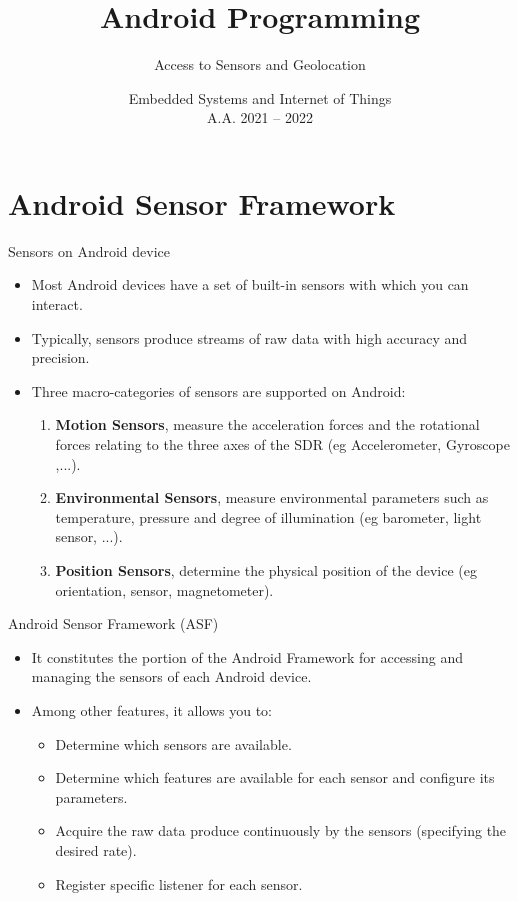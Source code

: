 \documentclass{beamer}
\title[Android -- 3B -- Sensor, Geolocation]{Android Programming}
\subtitle{Access to Sensors and Geolocation}
\date[ver. 1.0 (20220505)]{Embedded Systems and Internet of Things\\A.A. 2021 -- 2022}
\begin{document}
\begin{frame}
  \titlepage
\end{frame}




\section{Android Sensor Framework}

  \begin{frame}{Sensors on Android device}
    \begin{itemize}\itemsep10pt
      \item Most Android devices have a set of built-in sensors with which you
      can interact.
      \item Typically, sensors produce streams of raw data with high accuracy
      and precision.
      \item Three macro-categories of sensors are supported on Android:
      \begin{enumerate}
        \item \textbf{Motion Sensors}, measure the acceleration forces and the rotational
        forces relating to the three axes of the SDR (eg Accelerometer,
        Gyroscope ,...).
        \item \textbf{Environmental Sensors}, measure environmental parameters
        such as temperature, pressure and degree of illumination (eg barometer,
        light sensor, ...).
        \item \textbf{Position Sensors}, determine the physical position of the
        device (eg orientation, sensor, magnetometer).
      \end{enumerate}
    \end{itemize}
  \end{frame}

  \begin{frame}{Android Sensor Framework (ASF)}
    \begin{itemize}\itemsep20pt
      \item It constitutes the portion of the Android Framework for accessing
      and managing the sensors of each Android device.
      \item Among other features, it allows you to:
      \begin{itemize}
        \item Determine which sensors are available.
        \item Determine which features are available for each sensor and
        configure its parameters.
        \item Acquire the raw data produce continuously by the sensors
        (specifying the desired rate).
        \item Register specific listener for each sensor.
      \end{itemize}
    \end{itemize}
  \vfill
  \end{frame}
\end{document}
